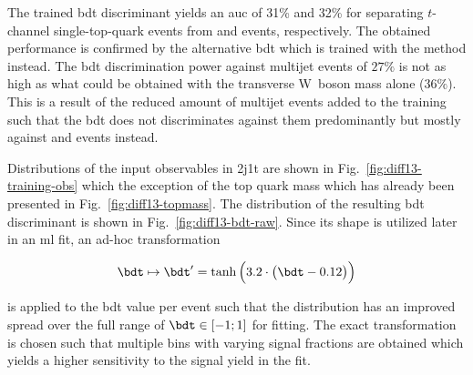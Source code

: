 
The trained \gls{bdt} discriminant yields an \gls{auc} of 31\% and 32\% for separating $t$-channel single-top-quark events from \ttbar and \wjets events, respectively. The obtained performance is confirmed by the alternative \gls{bdt} which is trained with the \GRADIENTBOOST method instead. The \gls{bdt} discrimination power against multijet events of $27\%$ is not as high as what could be obtained with the transverse W~boson mass alone ($36\%$). This is a result of the reduced amount of multijet events added to the training such that the \gls{bdt} does not discriminates against them predominantly but mostly against \ttbar and \wjets events instead.

Distributions of the input observables in 2j1t are shown in Fig.~\ref{fig:diff13-training-obs} which the exception of the top quark mass which has already been presented in Fig.~\ref{fig:diff13-topmass}. The distribution of the resulting \gls{bdt} discriminant is shown in Fig.~\ref{fig:diff13-bdt-raw}. Since its shape is utilized later in an \gls{ml} fit, an ad-hoc transformation 

\begin{equation}
\bdt\mapsto\bdt^\prime=\tanh\Big(3.2\cdot\big(\bdt-0.12\big)\Big)
\end{equation}

is applied to the \gls{bdt} value per event such that the distribution has an improved spread over the full range of $\bdt\in[-1;1]$ for fitting. The exact transformation is chosen such that multiple bins with varying signal fractions are obtained which yields a higher sensitivity to the signal yield in the fit.


